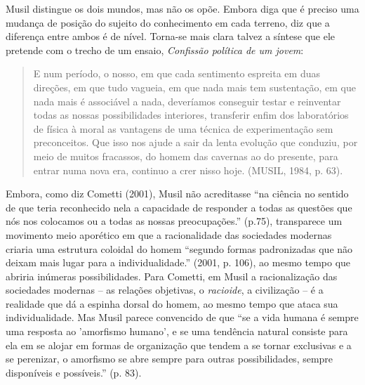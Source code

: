 Musil distingue os dois mundos, mas não os opõe. Embora diga que é
preciso uma mudança de posição do sujeito do conhecimento em cada
terreno, diz que a diferença entre ambos é de nível. Torna-se mais clara
talvez a síntese que ele pretende com o trecho de um ensaio,
\emph{Confissão política de um jovem}:

\begin{quote}
E num período, o nosso, em que cada sentimento espreita em duas
direções, em que tudo vagueia, em que nada mais tem sustentação, em que
nada mais é associável a nada, deveríamos conseguir testar e reinventar
todas as nossas possibilidades interiores, transferir enfim dos
laboratórios de física à moral as vantagens de uma técnica de
experimentação sem preconceitos. Que isso nos ajude a sair da lenta
evolução que conduziu, por meio de muitos fracassos, do homem das
cavernas ao do presente, para entrar numa nova era, continuo a crer
nisso hoje. (MUSIL, 1984, p. 63).
\end{quote}

Embora, como diz Cometti (2001), Musil não acreditasse ``na ciência no
sentido de que teria reconhecido nela a capacidade de responder a todas
as questões que nós nos colocamos ou a todas as nossas preocupações.''
(p.75), transparece um movimento meio aporético em que a racionalidade
das sociedades modernas criaria uma estrutura coloidal do homem
``segundo formas padronizadas que não deixam mais lugar para a
individualidade.'' (2001, p. 106), ao mesmo tempo que abriria inúmeras
possibilidades. Para Cometti, em Musil a racionalização das sociedades
modernas -- as relações objetivas, o \emph{racioide}, a civilização -- é
a realidade que dá a espinha dorsal do homem, ao mesmo tempo que ataca
sua individualidade. Mas Musil parece convencido de que ``se a vida
humana é sempre uma resposta ao 'amorfismo humano', e se uma tendência
natural consiste para ela em se alojar em formas de organização que
tendem a se tornar exclusivas e a se perenizar, o amorfismo se abre
sempre para outras possibilidades, sempre disponíveis e possíveis.'' (p.
83).

